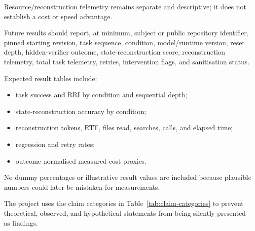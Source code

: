 Resource/reconstruction telemetry remains separate and descriptive; it does not establish a cost or speed advantage.

Future results should report, at minimum, subject or public repository identifier, pinned starting revision, task sequence, condition, model/runtime version, reset depth, hidden-verifier outcome, state-reconstruction score, reconstruction telemetry, total task telemetry, retries, intervention flags, and sanitisation status.

Expected result tables include:
\begin{itemize}
    \item task success and RRI by condition and sequential depth;
    \item state-reconstruction accuracy by condition;
    \item reconstruction tokens, RTF, files read, searches, calls, and elapsed time;
    \item regression and retry rates;
    \item outcome-normalised measured cost proxies.
\end{itemize}

No dummy percentages or illustrative result values are included because plausible numbers could later be mistaken for measurements.

The project uses the claim categories in Table~\ref{tab:claim-categories} to prevent theoretical, observed, and hypothetical statements from being silently presented as findings.


